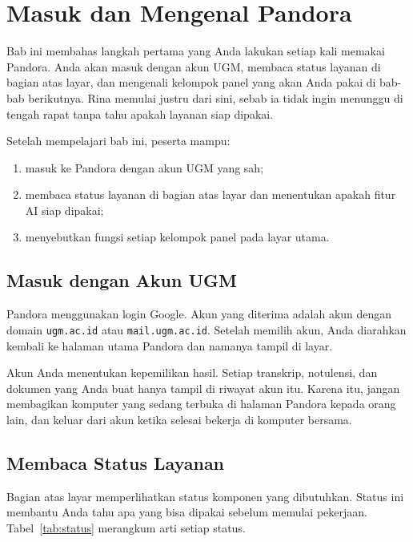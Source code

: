 \chapter{Masuk dan Mengenal Pandora}

Bab ini membahas langkah pertama yang Anda lakukan setiap kali memakai Pandora. Anda akan masuk dengan akun UGM, membaca status layanan di bagian atas layar, dan mengenali kelompok panel yang akan Anda pakai di bab-bab berikutnya. Rina memulai justru dari sini, sebab ia tidak ingin menunggu di tengah rapat tanpa tahu apakah layanan siap dipakai.

\begin{indikator}
Setelah mempelajari bab ini, peserta mampu:
\begin{enumerate}
  \item masuk ke Pandora dengan akun UGM yang sah;
  \item membaca status layanan di bagian atas layar dan menentukan apakah fitur AI siap dipakai;
  \item menyebutkan fungsi setiap kelompok panel pada layar utama.
\end{enumerate}
\end{indikator}

\section{Masuk dengan Akun UGM}
Pandora menggunakan login Google. Akun yang diterima adalah akun dengan domain \texttt{ugm.ac.id} atau \texttt{mail.ugm.ac.id}. Setelah memilih akun, Anda diarahkan kembali ke halaman utama Pandora dan namanya tampil di layar.

Akun Anda menentukan kepemilikan hasil. Setiap transkrip, notulensi, dan dokumen yang Anda buat hanya tampil di riwayat akun itu. Karena itu, jangan membagikan komputer yang sedang terbuka di halaman Pandora kepada orang lain, dan keluar dari akun ketika selesai bekerja di komputer bersama.

\section{Membaca Status Layanan}
Bagian atas layar memperlihatkan status komponen yang dibutuhkan. Status ini membantu Anda tahu apa yang bisa dipakai sebelum memulai pekerjaan. Tabel~\ref{tab:status} merangkum arti setiap status.


